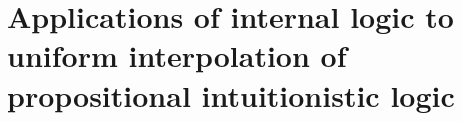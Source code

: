 \chapter{Applications of internal logic to uniform interpolation of propositional intuitionistic logic}